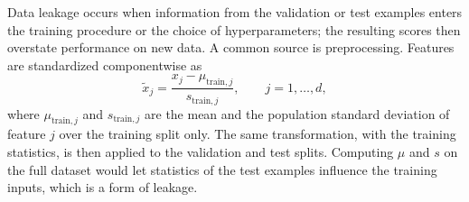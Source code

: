 Data leakage occurs when information from the validation or test examples enters the training procedure or the choice of hyperparameters; the resulting scores then overstate performance on new data. A common source is preprocessing. Features are standardized componentwise as
\begin{equation}
  \tilde x_j=\frac{x_j-\mu_{\mathrm{train},j}}{s_{\mathrm{train},j}},\qquad j=1,\dots,d,
  \label{eq:standardize}
\end{equation}
where $\mu_{\mathrm{train},j}$ and $s_{\mathrm{train},j}$ are the mean and the population standard deviation of feature $j$ over the training split only. The same transformation, with the training statistics, is then applied to the validation and test splits. Computing $\mu$ and $s$ on the full dataset would let statistics of the test examples influence the training inputs, which is a form of leakage.
